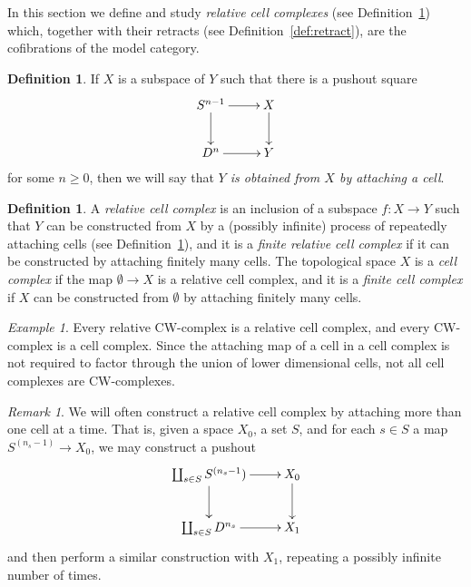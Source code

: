 \documentclass{amsart}
\numberwithin{equation}{section}
\theoremstyle{slplain}
\theoremstyle{definition}
\newtheorem{defn}[equation]{Definition} %
\theoremstyle{remark}
\newtheorem{rem}[equation]{Remark}      %
\newtheorem{ex}[equation]{Example}      %
\newcommand{\defref}{Definition~\ref}
\begin{document}
In this section we define and study \emph{relative cell complexes}
(see \defref{def:CellComp}) which, together with their retracts (see
\defref{def:retract}), are the cofibrations of the model category.

\begin{defn}
  \label{def:AttCell}
  If $X$ is a subspace of $Y$ such that there is a pushout square
  \begin{displaymath}
    \xymatrix{
      {S^{n-1}} \ar[r] \ar[d]
      & {X} \ar[d]\\
      {D^{n}} \ar[r]
      & {Y}
    }
  \end{displaymath}
  for some $n \ge 0$, then we will say that \emph{$Y$ is obtained from
  $X$ by attaching a cell}.
\end{defn}


\begin{defn}
  \label{def:CellComp}
  A \emph{relative cell complex} is an inclusion of a subspace
  $f\colon X \to Y$ such that $Y$ can be constructed from $X$ by a
  (possibly infinite) process of repeatedly attaching cells (see
  \defref{def:AttCell}), and it is a \emph{finite relative cell
    complex} if it can be constructed by attaching finitely many
  cells.  The topological space $X$ is a \emph{cell complex} if the
  map $\emptyset \to X$ is a relative cell complex, and it is a
  \emph{finite cell complex} if $X$ can be constructed from
  $\emptyset$ by attaching finitely many cells.
\end{defn}


\begin{ex}
  \label{ex:CWcomp}
  Every relative CW-complex is a relative cell complex, and every
  CW-complex is a cell complex.  Since the attaching map of a cell in
  a cell complex is not required to factor through the union of lower
  dimensional cells, not all cell complexes are CW-complexes.
\end{ex}


\begin{rem}
  \label{rem:MultpleCells}
  We will often construct a relative cell complex by attaching more
  than one cell at a time.  That is, given a space $X_{0}$, a set $S$,
  and for each $s \in S$ a map $S^{(n_{s}-1)} \to X_{0}$, we may
  construct a pushout
  \begin{displaymath}
    \xymatrix{
      {\coprod_{s\in S} S^{(n_{s}-1})} \ar[r] \ar[d]
      & {X_{0}} \ar[d]\\
      {\coprod_{s\in S} D^{n_{s}}} \ar[r]
      & {X_{1}}
    }
  \end{displaymath}
  and then perform a similar construction with $X_{1}$, repeating a
  possibly infinite number of times.
\end{rem}
\end{document}
